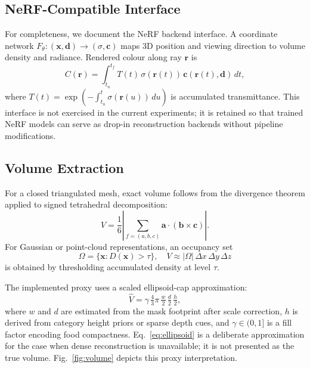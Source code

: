 \documentclass[conference]{IEEEtran}
\begin{document}
\subsection{NeRF-Compatible Interface}

For completeness, we document the NeRF backend interface. A coordinate
network $F_\theta : (\mathbf{x},\mathbf{d}) \to (\sigma, \mathbf{c})$
maps 3D position and viewing direction to volume density and radiance.
Rendered colour along ray $\mathbf{r}$ is
\begin{equation}
    C(\mathbf{r}) = \int_{t_n}^{t_f}
        T(t)\,\sigma\!\left(\mathbf{r}(t)\right)\,
        \mathbf{c}\!\left(\mathbf{r}(t),\mathbf{d}\right)\,dt,
    \label{eq:nerf}
\end{equation}
where $T(t) = \exp\!\left(-\int_{t_n}^t \sigma(\mathbf{r}(u))\,du\right)$
is accumulated transmittance. This interface is not exercised in the current
experiments; it is retained so that trained NeRF models can serve as
drop-in reconstruction backends without pipeline modifications.

\subsection{Volume Extraction}
\label{sec:volume}

For a closed triangulated mesh, exact volume follows from the divergence
theorem applied to signed tetrahedral decomposition:
\begin{equation}
    V = \frac{1}{6}\left|\sum_{f=(a,b,c)} \mathbf{a}\cdot(\mathbf{b}\times\mathbf{c})\right|.
    \label{eq:meshvol}
\end{equation}
For Gaussian or point-cloud representations, an occupancy set
\begin{equation}
    \Omega = \{\mathbf{x} : D(\mathbf{x}) > \tau\},
    \quad
    V \approx |\Omega|\,\Delta x\,\Delta y\,\Delta z
    \label{eq:voxvol}
\end{equation}
is obtained by thresholding accumulated density at level $\tau$.

The implemented proxy uses a scaled ellipsoid-cap approximation:
\begin{equation}
    \hat{V} = \gamma\,\tfrac{4}{3}\pi\,\tfrac{w}{2}\,\tfrac{d}{2}\,\tfrac{h}{2},
    \label{eq:ellipsoid}
\end{equation}
where $w$ and $d$ are estimated from the mask footprint after scale
correction, $h$ is derived from category height priors or sparse depth cues,
and $\gamma \in (0,1]$ is a fill factor encoding food compactness.
Eq.~\eqref{eq:ellipsoid} is a deliberate approximation for the case when
dense reconstruction is unavailable; it is not presented as the true volume.
Fig.~\ref{fig:volume} depicts this proxy interpretation.
\end{document}

